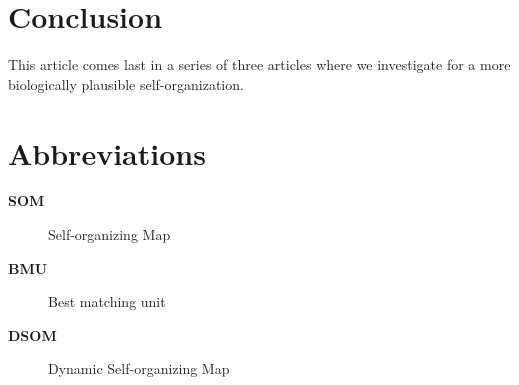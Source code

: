 \section{Conclusion}

This article comes last in a series of three articles where we investigate for
a more biologically plausible self-organization. 





\section*{Abbreviations}
\begin{description}
    \item[\bf SOM] Self-organizing Map
    \item[\bf BMU] Best matching unit
    \item[\bf DSOM] Dynamic Self-organizing Map
\end{description}








  


